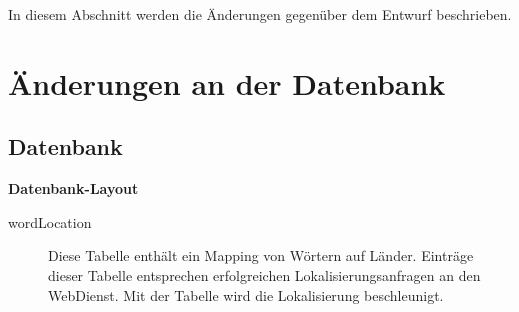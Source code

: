 In diesem Abschnitt werden die Änderungen gegenüber dem Entwurf beschrieben.

\section{Änderungen an der Datenbank}

\subsection{Datenbank}
	\textbf{Datenbank-Layout}
	\begin{description}
		\item[wordLocation] Diese Tabelle enthält ein Mapping von Wörtern auf Länder. Einträge dieser Tabelle entsprechen erfolgreichen Lokalisierungsanfragen an den WebDienst. Mit der Tabelle wird die Lokalisierung  beschleunigt.
	\end{description}

